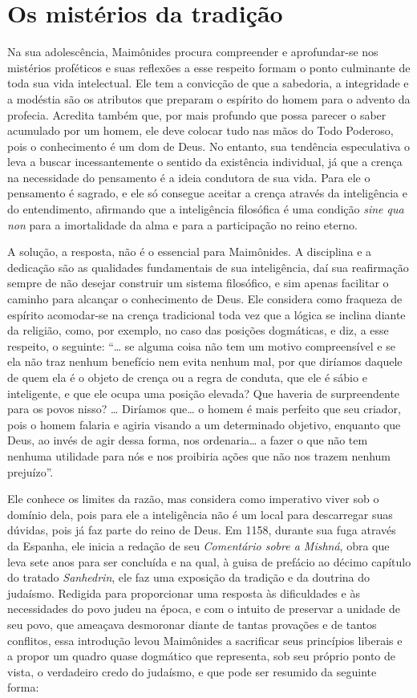 \section{Os mistérios da tradição}

Na sua adolescência, Maimônides procura compreender e aprofundar-se
nos mistérios proféticos e suas reflexões a esse respeito formam o ponto
culminante de toda sua vida intelectual. Ele tem a convicção de que a
sabedoria, a integridade e a modéstia são os atributos que preparam o
espírito do homem para o advento da profecia. Acredita também que, por
mais profundo que possa parecer o saber acumulado por um homem, ele deve
colocar tudo nas mãos do Todo Poderoso, pois o conhecimento é um dom de
Deus. No entanto, sua tendência especulativa o leva a buscar
incessantemente o sentido da existência individual, já que a crença na
necessidade do pensamento é a ideia condutora de sua vida. Para ele o
pensamento é sagrado, e ele só consegue aceitar a crença através da
inteligência e do entendimento, afirmando que a inteligência filosófica
é uma condição \emph{sine qua non} para a imortalidade da alma e para a
participação no reino eterno.

A solução, a resposta, não é o essencial para Maimônides. A disciplina e 
a dedicação são as qualidades fundamentais de sua inteligência, daí sua 
reafirmação sempre de não desejar construir um sistema filosófico, e sim 
apenas facilitar o caminho para alcançar o conhecimento de Deus. Ele considera 
como fraqueza de espírito acomodar-se na crença tradicional toda vez que a lógica se inclina diante da religião, como, por exemplo, no caso das posições dogmáticas, e diz, a esse respeito, o seguinte: ``\ldots{} se alguma coisa não tem um motivo compreensível e se ela não traz nenhum benefício nem evita nenhum mal, por que diríamos daquele de quem ela é o objeto de crença ou a regra de conduta, que ele é sábio e inteligente, e que ele ocupa uma posição elevada? Que haveria de surpreendente para os povos nisso? \ldots{} Diríamos que\ldots{} o homem é mais perfeito que seu criador, pois o homem falaria e agiria visando a um determinado objetivo, enquanto que Deus, ao invés de agir dessa forma, nos ordenaria\ldots{} a fazer o que não tem nenhuma utilidade para nós e nos proibiria ações que não nos trazem nenhum prejuízo''. 

Ele conhece os limites da razão, mas considera como imperativo viver sob o domínio dela, pois para ele a inteligência não é um local para descarregar suas dúvidas, pois já faz parte do reino de Deus. Em 1158, durante sua fuga através da Espanha, ele inicia a redação de seu \emph{Comentário sobre a Mishná}, obra que leva sete anos para ser concluída e na qual, à guisa de prefácio ao décimo capítulo do tratado \emph{Sanhedrin}, ele faz uma exposição da tradição e da doutrina do judaísmo. Redigida para proporcionar uma resposta às dificuldades e às necessidades do povo judeu na época, e com o intuito de preservar a unidade de seu povo, que ameaçava desmoronar diante de tantas provações e de tantos conflitos, essa introdução levou Maimônides a sacrificar seus princípios liberais e a propor um quadro quase dogmático que representa, sob seu próprio ponto de vista, o verdadeiro credo do judaísmo, e que pode ser resumido da seguinte forma:

